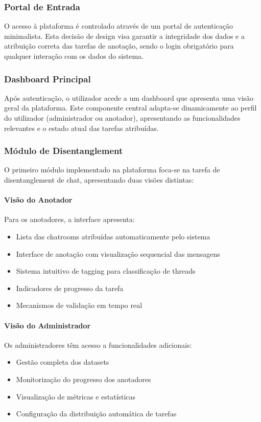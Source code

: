 \subsubsection{Portal de Entrada}
O acesso à plataforma é controlado através de um portal de autenticação minimalista. Esta decisão de design visa garantir a integridade dos dados e a atribuição correta das tarefas de anotação, sendo o login obrigatório para qualquer interação com os dados do sistema.

\subsubsection{Dashboard Principal}
Após autenticação, o utilizador acede a um dashboard que apresenta uma visão geral da plataforma. Este componente central adapta-se dinamicamente ao perfil do utilizador (administrador ou anotador), apresentando as funcionalidades relevantes e o estado atual das tarefas atribuídas.

\subsubsection{Módulo de Disentanglement}
O primeiro módulo implementado na plataforma foca-se na tarefa de disentanglement de chat, apresentando duas visões distintas:

\paragraph{Visão do Anotador}
Para os anotadores, a interface apresenta:
\begin{itemize}
    \item Lista das chatrooms atribuídas automaticamente pelo sistema
    \item Interface de anotação com visualização sequencial das mensagens
    \item Sistema intuitivo de tagging para classificação de threads
    \item Indicadores de progresso da tarefa
    \item Mecanismos de validação em tempo real
\end{itemize}

\paragraph{Visão do Administrador}
Os administradores têm acesso a funcionalidades adicionais:
\begin{itemize}
    \item Gestão completa dos datasets
    \item Monitorização do progresso dos anotadores
    \item Visualização de métricas e estatísticas
    \item Configuração da distribuição automática de tarefas
\end{itemize}

